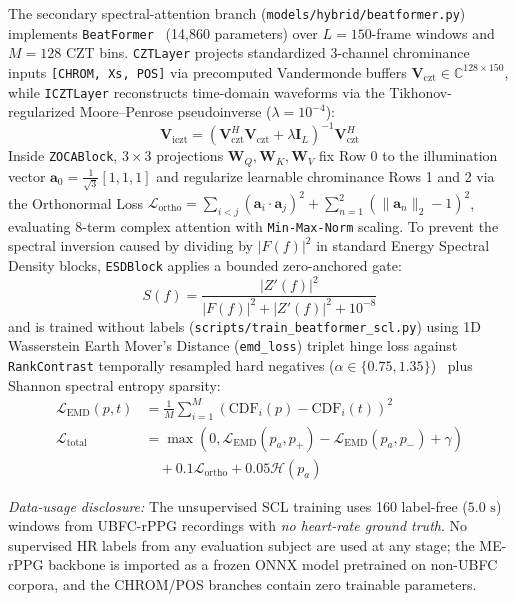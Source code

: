 \documentclass[conference]{IEEEtran}
\begin{document}
The secondary spectral-attention branch (\texttt{models/hybrid/beatformer.py}) implements \texttt{BeatFormer}~\cite{comas2025beatformer} (14,860 parameters) over $L=150$-frame windows and $M=128$ CZT bins. \texttt{CZTLayer} projects standardized 3-channel chrominance inputs \texttt{[CHROM, Xs, POS]} via precomputed Vandermonde buffers $\mathbf{V}_{\text{czt}} \in \mathbb{C}^{128\times 150}$, while \texttt{ICZTLayer} reconstructs time-domain waveforms via the Tikhonov-regularized Moore--Penrose pseudoinverse ($\lambda = 10^{-4}$):
\begin{equation}
\mathbf{V}_{\text{iczt}} = \left(\mathbf{V}_{\text{czt}}^H \mathbf{V}_{\text{czt}} + \lambda \mathbf{I}_L\right)^{-1} \mathbf{V}_{\text{czt}}^H
\label{eq:iczt}
\end{equation}
Inside \texttt{ZOCABlock}, $3\times 3$ projections $\mathbf{W}_Q, \mathbf{W}_K, \mathbf{W}_V$ fix Row 0 to the illumination vector $\mathbf{a}_0 = \frac{1}{\sqrt{3}}[1,1,1]$ and regularize learnable chrominance Rows 1 and 2 via the Orthonormal Loss $\mathcal{L}_{\text{ortho}} = \sum_{i<j}(\mathbf{a}_i\cdot\mathbf{a}_j)^2 + \sum_{n=1}^2(\|\mathbf{a}_n\|_2 - 1)^2$, evaluating 8-term complex attention with \texttt{Min-Max-Norm} scaling. To prevent the spectral inversion caused by dividing by $\lvert F(f)\rvert^2$ in standard Energy Spectral Density blocks, \texttt{ESDBlock} applies a bounded zero-anchored gate:
\begin{equation}
S(f) = \frac{\lvert Z'(f)\rvert^2}{\lvert F(f)\rvert^2 + \lvert Z'(f)\rvert^2 + 10^{-8}}
\label{eq:esd_gate}
\end{equation}
and is trained without labels (\texttt{scripts/train\_beatformer\_scl.py}) using 1D Wasserstein Earth Mover's Distance (\texttt{emd\_loss}) triplet hinge loss against \texttt{RankContrast} temporally resampled hard negatives ($\alpha \in \{0.75, 1.35\}$)~\cite{sun2024repss} plus Shannon spectral entropy sparsity:
\begin{align}
\mathcal{L}_{\text{EMD}}(p, t) &= \frac{1}{M}\sum_{i=1}^{M}\left(\text{CDF}_i(p) - \text{CDF}_i(t)\right)^2 \label{eq:emd} \\
\mathcal{L}_{\text{total}} &= \max\!\left(0, \mathcal{L}_{\text{EMD}}(p_a, p_+) - \mathcal{L}_{\text{EMD}}(p_a, p_-) + \gamma\right) \nonumber\\
&\quad + 0.1\mathcal{L}_{\text{ortho}} + 0.05\mathcal{H}(p_a) \label{eq:scl_total}
\end{align}

\noindent\textit{Data-usage disclosure:} The unsupervised SCL training
uses 160 label-free ($5.0\text{ s}$) windows from UBFC-rPPG recordings
with \emph{no heart-rate ground truth}. No supervised HR labels from any
evaluation subject are used at any stage; the ME-rPPG backbone is
imported as a frozen ONNX model pretrained on non-UBFC corpora, and the
CHROM/POS branches contain zero trainable parameters.
\end{document}
